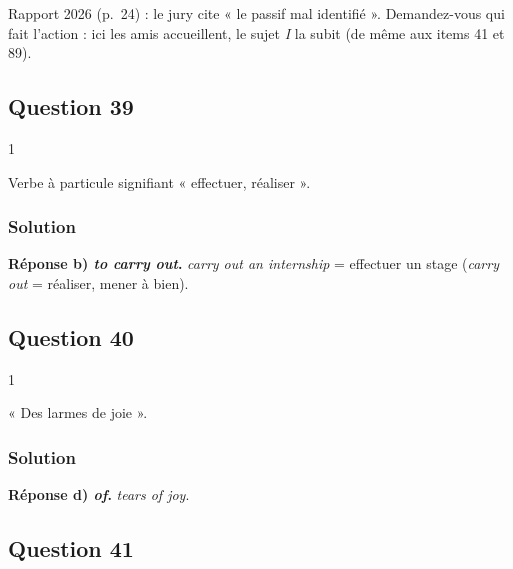 \documentclass[11pt,a4paper]{article}
\begin{document}
\begin{jury}

Rapport 2026 (p.~24) : le jury cite « le passif mal identifié ». Demandez-vous qui fait l'action : ici les amis accueillent, le sujet \emph{I} la subit (de même aux items 41 et 89).

\end{jury}

\hypertarget{question-39}{%
\subsection{Question 39}\label{question-39}}

\begin{indication}{1}

Verbe à particule signifiant « effectuer, réaliser ».

\end{indication}

\hypertarget{solution-38}{%
\subsubsection{Solution}\label{solution-38}}

\textbf{Réponse b) \emph{to carry out}.} \emph{carry out an internship} = effectuer un stage (\emph{carry out} = réaliser, mener à bien).

\hypertarget{question-40}{%
\subsection{Question 40}\label{question-40}}

\begin{indication}{1}

« Des larmes de joie ».

\end{indication}

\hypertarget{solution-39}{%
\subsubsection{Solution}\label{solution-39}}

\textbf{Réponse d) \emph{of}.} \emph{tears of joy}.

\hypertarget{question-41}{%
\subsection{Question 41}\label{question-41}}
\end{document}
